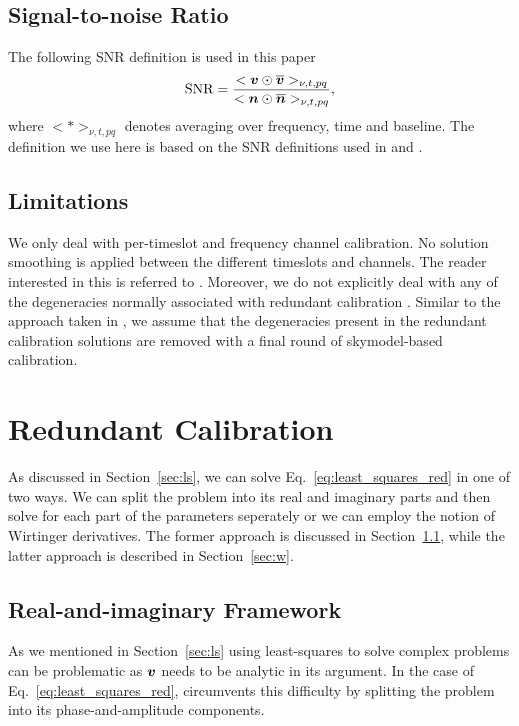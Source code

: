\documentclass[useAMS,usenatbib]{mn2e}
\newcommand{\bv}{\bmath{v}}
\newcommand{\bn}{\bmath{n}}
\newcommand{\conj}[1]{\overline{#1}}
\begin{document}
\subsection{Signal-to-noise Ratio}
\label{sec:snr}
The following SNR definition is used in this paper  
\begin{equation}
\label{}
\textrm{SNR} = \frac{<\bv\odot\conj{\bv}>_{\nu,t,pq}}{<\bn\odot\conj{\bn}>_{\nu,t,pq}}, 
\end{equation}
where $<*>_{\nu,t,pq}$ denotes averaging over frequency, time and baseline. The definition we use here is based on the SNR definitions used in \citet{Liu2010} and \citet{Marthi2014}.

\subsection{Limitations}
\label{sec:scope}
We only deal with per-timeslot and frequency channel calibration. No solution smoothing  
is applied between the different timeslots and channels. The reader interested in this is referred to \citep{Zheng2014}. 
Moreover, we do not explicitly deal with any of the degeneracies normally associated with redundant calibration \citep{Zheng2014,Kurien2016}. Similar to the approach taken in \citep{Marthi2014}, we assume that the degeneracies present in the redundant calibration solutions are removed with a final round of skymodel-based calibration.

\section{Redundant Calibration}
\label{sec:main_sec}
As discussed in Section~\ref{sec:ls}, we can solve Eq.~\eqref{eq:least_squares_red} in one of two ways. We can split the problem into its real and
imaginary parts and then solve for each part of the parameters seperately or we can employ the notion of Wirtinger derivatives. The former 
approach is discussed in Section~\ref{sec:ri}, while the latter approach is described in Section~\ref{sec:w}. 

\subsection{Real-and-imaginary Framework}
\label{sec:ri}
As we mentioned in Section~\ref{sec:ls} using least-squares to solve complex problems can be problematic as $\bv$ needs to be analytic in its argument. In the case 
of Eq.~\eqref{eq:least_squares_red}, \citet{Liu2010} circumvents this difficulty by 
splitting the problem into its phase-and-amplitude components. 
\end{document}
